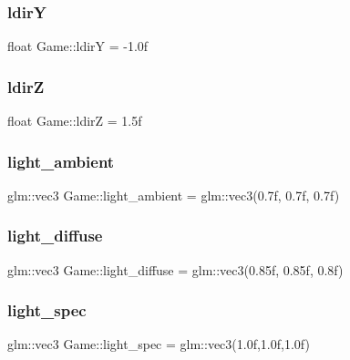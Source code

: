 \mbox{\label{class_game_ab1dba5d397b75fe389f0a2569c6d2a09}} 
\subsubsection{\texorpdfstring{ldirY}{ldirY}}
{\footnotesize\ttfamily float Game\+::ldirY = -\/1.\+0f}

\mbox{\label{class_game_a9c84b35a1a322b8193c8d1443ace58c1}} 
\subsubsection{\texorpdfstring{ldirZ}{ldirZ}}
{\footnotesize\ttfamily float Game\+::ldirZ = 1.\+5f}

\mbox{\label{class_game_ab59fa6e482623110a011d5319e40bc04}} 
\subsubsection{\texorpdfstring{light\_ambient}{light\_ambient}}
{\footnotesize\ttfamily glm\+::vec3 Game\+::light\+\_\+ambient = glm\+::vec3(0.\+7f, 0.\+7f, 0.\+7f)}

\mbox{\label{class_game_ad6c83fd9cb6b646a09a5c07a0d2f4127}} 
\subsubsection{\texorpdfstring{light\_diffuse}{light\_diffuse}}
{\footnotesize\ttfamily glm\+::vec3 Game\+::light\+\_\+diffuse = glm\+::vec3(0.\+85f, 0.\+85f, 0.\+8f)}

\mbox{\label{class_game_a600d2f3f0a0407010eb46640d2157290}} 
\subsubsection{\texorpdfstring{light\_spec}{light\_spec}}
{\footnotesize\ttfamily glm\+::vec3 Game\+::light\+\_\+spec = glm\+::vec3(1.\+0f,1.\+0f,1.\+0f)}

